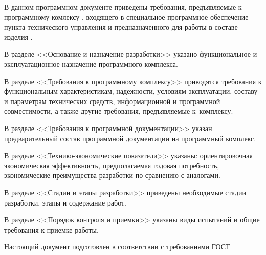 \newpage\annotation

В данном программном документе приведены требования, предъявляемые к программному комлексу \programname, входящего в специальное программное обеспечение пункта технического управления и предназначенного для работы в составе изделия \productname. 

В разделе <<Основание и назначение разработки>> указано функциональное и эксплуатационное назначение программного комплекса.

В разделе <<Требования к программному комплексу>> приводятся требования к функциональным характеристикам, надежности, условиям эксплуатации, составу и параметрам технических средств, информационной и программной совместимости, а также другие требования, предъявляемые к~комплексу. 

В разделе <<Требования к программной документации>> указан предварительный состав программной документации на программный комплекс.

В разделе <<Технико-экономические показатели>> указаны: ориентировочная экономическая эффективность, предполагаемая годовая потребность, экономические преимущества разработки по сравнению с аналогами.

В разделе <<Стадии и этапы разработки>> приведены необходимые стадии разработки, этапы и содержание работ.

В разделе <<Порядок контроля и приемки>> указаны виды испытаний и общие требования к приемке работы.

Настоящий документ подготовлен в соответствии с требованиями ГОСТ~\cite{gost19201}
